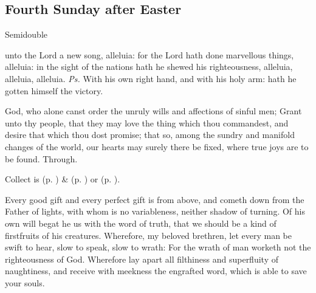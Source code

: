 \clearpage
\subsection{Fourth Sunday after Easter}
\begin{inhead}
    {Semidouble}
\end{inhead}


\introit
{} unto the Lord a new song, alleluia: for the Lord hath done marvellous things, alleluia: in the sight of the nations hath he shewed his righteousness, alleluia, alleluia, alleluia. \textit{Ps.} With his own right hand, and with his holy arm: hath he gotten himself the victory.

\collect
{} God, who alone canst order the unruly wills and affections of sinful men; Grant unto thy people, that they may love the thing which thou commandest, and desire that which thou dost promise; that so, among the sundry and manifold changes of the world, our hearts may surely there be fixed, where true joys are to be found. Through.
\begin{rubric}
     Collect is  (p. \pageref{SPMaryInEaster}) \&   (p. \pageref{SPAgainst}) or  (p. \pageref{SPChiefBishop}).
\end{rubric}

 Every good gift and every perfect gift is from above, and cometh down from the Father of lights, with whom is no variableness, neither shadow of turning. Of his own will begat he us with the word of truth, that we should be a kind of firstfruits of his creatures. Wherefore, my beloved brethren, let every man be swift to hear, slow to speak, slow to wrath: For the wrath of man worketh not the righteousness of God. Wherefore lay apart all filthiness and superfluity of naughtiness, and receive with meekness the engrafted word, which is able to save your souls.


